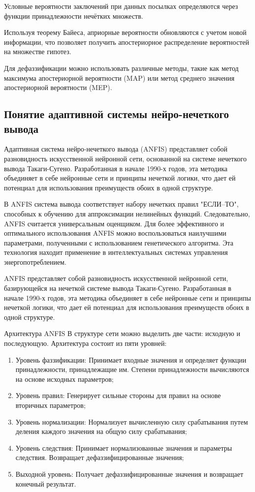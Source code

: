 Условные вероятности заключений при данных посылках определяются через функции принадлежности нечётких множеств.

Используя теорему Байеса, априорные вероятности обновляются с учетом новой информации, что позволяет получить апостериорное распределение вероятностей на множестве гипотез.

Для дефаззификации можно использовать различные методы, такие как метод максимума апостериорной вероятности (MAP) или метод среднего значения апостериорной вероятности (MEP).

\subsection{Понятие адаптивной системы нейро-нечеткого вывода}
Адаптивная система нейро-нечеткого вывода (ANFIS) представляет собой разновидность искусственной нейронной сети, основанной на системе нечеткого вывода Такаги-Сугено. Разработанная в начале 1990-х годов, эта методика объединяет в себе нейронные сети и принципы нечеткой логики, что дает ей потенциал для использования преимуществ обоих в одной структуре.

В ANFIS система вывода соответствует набору нечетких правил "ЕСЛИ–ТО", способных к обучению для аппроксимации нелинейных функций. Следовательно, ANFIS считается универсальным оценщиком. Для более эффективного и оптимального использования ANFIS можно воспользоваться наилучшими параметрами, полученными с использованием генетического алгоритма. Эта технология находит применение в интеллектуальных системах управления энергопотреблением.

ANFIS представляет собой разновидность искусственной нейронной сети, базирующейся на нечеткой системе вывода Такаги-Сугено. Разработанная в начале 1990-х годов, эта методика объединяет в себе нейронные сети и принципы нечеткой логики, что дает ей потенциал для использования преимуществ обоих в одной структуре.

Архитектура ANFIS
В структуре сети можно выделить две части: исходную и последующую. Архитектура состоит из пяти уровней:
\begin{enumerate}
\item Уровень фаззификации: Принимает входные значения и определяет функции принадлежности, принадлежащие им. Степени принадлежности вычисляются на основе исходных параметров;
\item Уровень правил: Генерирует сильные стороны для правил на основе вторичных параметров;
\item Уровень нормализации: Нормализует вычисленную силу срабатывания путем деления каждого значения на общую силу срабатывания;
\item Уровень следствия: Принимает нормализованные значения и параметры следствия. Возвращает дефаззифицированные значения;
\item Выходной уровень: Получает дефаззифицированные значения и возвращает конечный результат.
\end{enumerate}


